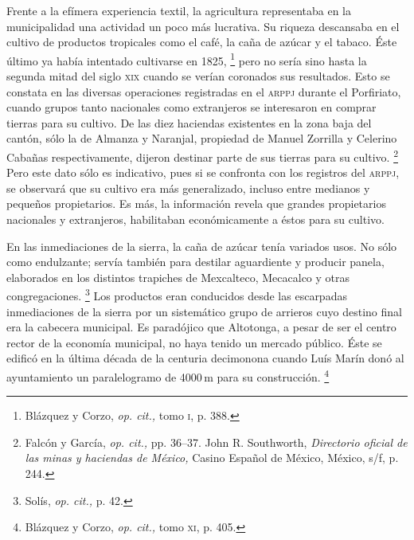 \documentclass[14pt,twoside,final]{extbook} %
\let\oldfootnote\footnote
\renewcommand\footnote[1]{%
\oldfootnote{\hspace{1mm}#1}}
\begin{document}
Frente a la efímera experiencia textil, la agricultura representaba en la municipalidad una actividad un poco más lucrativa. Su riqueza descansaba en el cultivo de productos tropicales como el café, la caña de azúcar y el tabaco. Éste último ya había intentado cultivarse en 1825,\footnote{Blázquez y Corzo, \emph{op. cit.,} tomo \textsc{i}, p. 388.} pero no sería sino hasta la segunda mitad del siglo \textsc{xix} cuando se verían coronados sus resultados. Esto se constata en las diversas operaciones registradas en el \textsc{arppj} durante el Porfiriato, cuando grupos tanto nacionales como extranjeros se interesaron en comprar tierras para su cultivo. De las diez haciendas existentes en la zona baja del cantón, sólo la de Almanza y Naranjal, propiedad de Manuel Zorrilla y Celerino Cabañas respectivamente, dijeron destinar parte de sus tierras para su cultivo.\footnote{Falcón y García, \emph{op. cit.,} pp. 36--37. John R. Southworth, \emph{Directorio oficial de las minas y haciendas de México,} Casino Español de México, México, s/f, p. 244.} Pero este dato sólo es indicativo, pues si se confronta con los registros del \textsc{arppj}, se observará que su cultivo era más generalizado, incluso entre medianos y pequeños propietarios. Es más, la información revela que grandes propietarios nacionales y extranjeros, habilitaban económicamente a éstos para su cultivo.

En las inmediaciones de la sierra, la caña de azúcar tenía variados usos. No sólo como endulzante; servía también para destilar aguardiente y producir panela, elaborados en los distintos trapiches de Mexcalteco, Mecacalco y otras congregaciones.\footnote{Solís, \emph{op. cit.,} p. 42.} Los productos eran conducidos desde las escarpadas inmediaciones de la sierra por un sistemático grupo de arrieros cuyo destino final era la cabecera municipal. Es paradójico que Altotonga, a pesar de ser el centro rector de la economía municipal, no haya tenido un mercado público. Éste se edificó en la última década de la centuria decimonona cuando Luís Marín donó al ayuntamiento un paralelogramo de 4000\,m para su construcción.\footnote{Blázquez y Corzo, \emph{op. cit.,} tomo \textsc{xi}, p. 405.}
\end{document}

